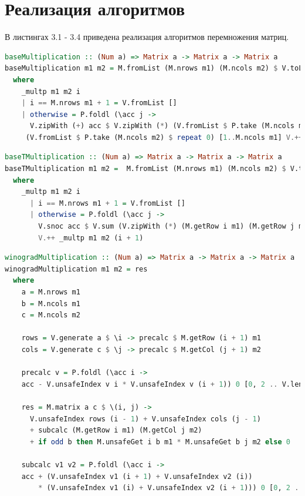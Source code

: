 \documentclass[12pt]{report}
\begin{document}
\section{Реализация алгоритмов}

В листингах 3.1 - 3.4 приведена реализация алгоритмов перемножения матриц.

\begin{lstlisting}[label=some-code,caption=Функция умножения матриц обычным способом, language=Haskell]
baseMultiplication :: (Num a) => Matrix a -> Matrix a -> Matrix a
baseMultiplication m1 m2 = M.fromList (M.nrows m1) (M.ncols m2) $ V.toList $ _multp m1 m2 1
  where
    _multp m1 m2 i
    | i == M.nrows m1 + 1 = V.fromList []
    | otherwise = P.foldl (\acc j ->
      V.zipWith (+) acc $ V.zipWith (*) (V.fromList $ P.take (M.ncols m2) $ repeat (M.getElem i j m1)) (M.getRow j m2))
     (V.fromList $ P.take (M.ncols m2) $ repeat 0) [1..M.ncols m1] V.++ _multp m1 m2 (i + 1)
\end{lstlisting}

\begin{lstlisting}[label=some-code,caption=Функция умножения матриц с транспонированием,language=Haskell]
baseTMultiplication :: (Num a) => Matrix a -> Matrix a -> Matrix a
baseTMultiplication m1 m2 =  M.fromList (M.nrows m1) (M.ncols m2) $ V.toList $ _multp m1 (M.transpose m2) 1
  where
    _multp m1 m2 i
      | i == M.nrows m1 + 1 = V.fromList []
      | otherwise = P.foldl (\acc j ->
        V.snoc acc $ V.sum (V.zipWith (*) (M.getRow i m1) (M.getRow j m2))) (V.fromList []) [1..M.nrows m2]
        V.++ _multp m1 m2 (i + 1)
\end{lstlisting}

\begin{lstlisting}[label=some-code,caption=Функция умножения матриц по Винограду,language=Haskell]
winogradMultiplication :: (Num a) => Matrix a -> Matrix a -> Matrix a
winogradMultiplication m1 m2 = res
  where
    a = M.nrows m1
    b = M.ncols m1
    c = M.ncols m2

    rows = V.generate a $ \i -> precalc $ M.getRow (i + 1) m1
    cols = V.generate c $ \j -> precalc $ M.getCol (j + 1) m2

    precalc v = P.foldl (\acc i ->
    acc - V.unsafeIndex v i * V.unsafeIndex v (i + 1)) 0 [0, 2 .. V.length v - 2]
	
    res = M.matrix a c $ \(i, j) ->
      V.unsafeIndex rows (i - 1) + V.unsafeIndex cols (j - 1)
      + subcalc (M.getRow i m1) (M.getCol j m2)
      + if odd b then M.unsafeGet i b m1 * M.unsafeGet b j m2 else 0
	
    subcalc v1 v2 = P.foldl (\acc i ->
    acc + (V.unsafeIndex v1 (i + 1) + V.unsafeIndex v2 (i))
        * (V.unsafeIndex v1 (i) + V.unsafeIndex v2 (i + 1))) 0 [0, 2 .. V.length v1 - 2]
\end{lstlisting}
\end{document}
